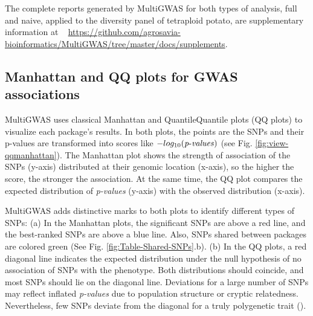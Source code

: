 \documentclass{article}
\begin{document}
The complete reports generated by MultiGWAS for both types of analysis, full and naive, applied to the diversity panel of tetraploid potato, are supplementary information at ~ \url{https://github.com/agrosavia-bioinformatics/MultiGWAS/tree/master/docs/supplements}.



\subsection{Manhattan and QQ plots for GWAS associations }

MultiGWAS uses classical Manhattan and Quantile\textendash Quantile plots (QQ plots) to visualize each package's results. In both plots, the points are the SNPs and their p-values are transformed into scores like $-log_{10}({\operatorname{\mathit{p-values}}})$ (see Fig. \ref{fig:view-qqmanhattan}). The Manhattan plot shows the strength of association of the SNPs (y-axis) distributed at their genomic location (x-axis), so the higher the score, the stronger the association. At the same time, the QQ plot compares the expected distribution of \emph{p-values} (y-axis) with the observed distribution (x-axis).

MultiGWAS adds distinctive marks to both plots to identify different types of SNPs: (a) In the Manhattan plots, the significant SNPs are above a red line, and the best-ranked SNPs are above a blue line. Also, SNPs shared between packages are colored green (See Fig. \ref{fig:Table-Shared-SNPs}.b). (b) In the QQ plots, a red diagonal line indicates the expected distribution under the null hypothesis of no association of SNPs with the phenotype. Both distributions should coincide, and most SNPs should lie on the diagonal line. Deviations for a large number of SNPs may reflect inflated {\emph{p-values }}due to population structure or cryptic relatedness. Nevertheless, few SNPs deviate from the diagonal for a truly polygenetic trait (\cite{Power2016}).
\end{document}
